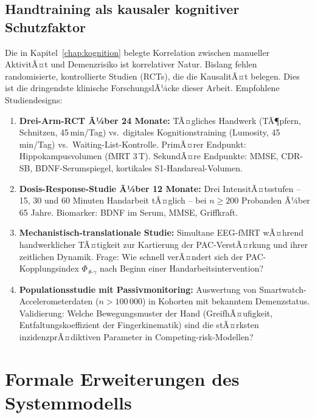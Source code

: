 ﻿\documentclass[12pt,a4paper]{report}
\theoremstyle{plain}
\theoremstyle{definition}
\theoremstyle{remark}
\begin{document}
\subsection{Handtraining als kausaler kognitiver Schutzfaktor}

Die in Kapitel~\ref{chap:kognition} belegte Korrelation zwischen
manueller AktivitÃ¤t und Demenzrisiko ist korrelativer Natur. Bislang
fehlen randomisierte, kontrollierte Studien (RCTs), die die KausalitÃ¤t
belegen. Dies ist die dringendste klinische ForschungslÃ¼cke dieser Arbeit.
Empfohlene Studiendesigns:

\begin{enumerate}
\item \textbf{Drei-Arm-RCT Ã¼ber 24 Monate:} TÃ¤gliches Handwerk
  (TÃ¶pfern, Schnitzen, 45\,min/Tag) vs.\ digitales Kognitionstraining
  (Lumosity, 45\,min/Tag) vs.\ Waiting-List-Kontrolle. PrimÃ¤rer Endpunkt:
  Hippokampusvolumen (fMRT 3\,T). SekundÃ¤re Endpunkte: MMSE, CDR-SB,
  BDNF-Serumspiegel, kortikales S1-Handareal-Volumen.
\item \textbf{Dosis-Response-Studie Ã¼ber 12 Monate:} Drei IntensitÃ¤tsstufen
  -- 15, 30 und 60 Minuten Handarbeit tÃ¤glich -- bei $n \geq 200$
  Probanden Ã¼ber 65 Jahre. Biomarker: BDNF im Serum, MMSE, Griffkraft.
\item \textbf{Mechanistisch-translationale Studie:} Simultane EEG-fMRT
  wÃ¤hrend handwerklicher TÃ¤tigkeit zur Kartierung der PAC-VerstÃ¤rkung
  und ihrer zeitlichen Dynamik. Frage: Wie schnell verÃ¤ndert sich der
  PAC-Kopplungsindex $\Phi_{\,\theta\text{-}\gamma}$ nach Beginn einer
  Handarbeitsintervention?
\item \textbf{Populationsstudie mit Passivmonitoring:} Auswertung von
  Smartwatch-Accelerometerdaten ($n > 100\,000$) in Kohorten mit
  bekanntem Demenzstatus. Validierung: Welche Bewegungsmuster der Hand
  (GreifhÃ¤ufigkeit, Entfaltungskoeffizient der Fingerkinematik) sind
  die stÃ¤rksten inzidenzprÃ¤diktiven Parameter in Competing-risk-Modellen?
\end{enumerate}

\section{Formale Erweiterungen des Systemmodells}
\end{document}
